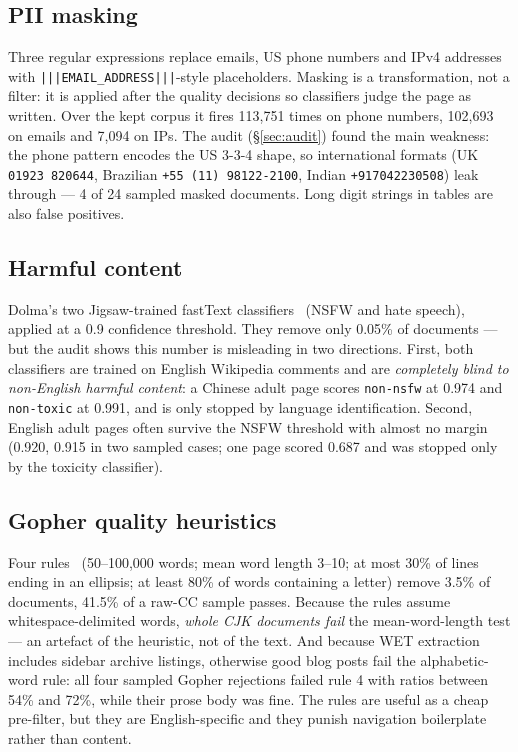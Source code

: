 \documentclass{article}
\begin{document}
\subsection{PII masking}
Three regular expressions replace emails, US phone numbers and IPv4 addresses with
\texttt{|||EMAIL\_ADDRESS|||}-style placeholders. Masking is a transformation, not a filter:
it is applied after the quality decisions so classifiers judge the page as written. Over the
kept corpus it fires 113{,}751 times on phone numbers, 102{,}693 on emails and 7{,}094 on IPs.
The audit (§\ref{sec:audit}) found the main weakness: the phone pattern encodes the US
3-3-4 shape, so international formats (UK \texttt{01923 820644}, Brazilian
\texttt{+55 (11) 98122-2100}, Indian \texttt{+917042230508}) leak through --- 4 of 24 sampled
masked documents. Long digit strings in tables are also false positives.

\subsection{Harmful content}
Dolma's two Jigsaw-trained fastText classifiers~\cite{dolma} (NSFW and hate speech), applied at
a 0.9 confidence threshold. They remove only 0.05\% of documents --- but the audit shows this number
is misleading in two directions. First, both classifiers are trained on English Wikipedia
comments and are \emph{completely blind to non-English harmful content}: a Chinese adult page
scores \texttt{non-nsfw} at 0.974 and \texttt{non-toxic} at 0.991, and is only stopped by
language identification. Second, English adult pages often survive the NSFW threshold with
almost no margin (0.920, 0.915 in two sampled cases; one page scored 0.687 and was stopped only
by the toxicity classifier).

\subsection{Gopher quality heuristics}
Four rules~\cite{gopher} (50--100{,}000 words; mean word length 3--10; at most 30\% of lines
ending in an ellipsis; at least 80\% of words containing a letter) remove 3.5\% of documents,
41.5\% of a raw-CC sample passes. Because the rules assume
whitespace-delimited words, \emph{whole CJK documents fail} the mean-word-length test --- an
artefact of the heuristic, not of the text. And because WET extraction includes sidebar
archive listings, otherwise good blog posts fail the alphabetic-word rule: all four sampled
Gopher rejections failed rule 4 with ratios between 54\% and 72\%, while their prose body was
fine. The rules are useful as a cheap pre-filter, but they are English-specific and they
punish navigation boilerplate rather than content.
\end{document}
